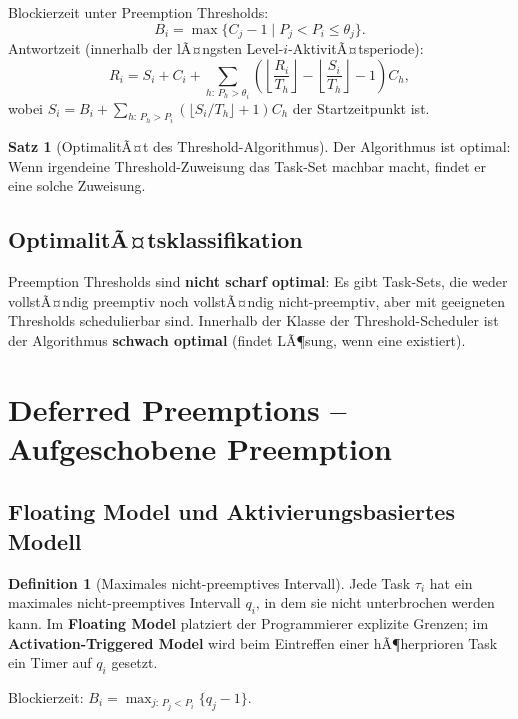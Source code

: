 ﻿\documentclass[a4paper,12pt]{report}
\theoremstyle{definition}
\newtheorem{definition}{Definition}[chapter]
\newtheorem{satz}{Satz}[chapter]
\begin{document}
Blockierzeit unter Preemption Thresholds:
\[
	B_i = \max\{C_j - 1 \mid P_j < P_i \leq \theta_j\}.
\]
Antwortzeit (innerhalb der lÃ¤ngsten Level-$i$-AktivitÃ¤tsperiode):
\begin{equation}
	R_i = S_i + C_i + \sum_{h:\,P_h > \theta_i}\left(\left\lfloor \frac{R_i}{T_h} \right\rfloor - \left\lfloor \frac{S_i}{T_h} \right\rfloor - 1\right) C_h,
	\label{eq:rta_threshold}
\end{equation}
wobei $S_i = B_i + \sum_{h:\,P_h > P_i}\left(\lfloor S_i/T_h \rfloor + 1\right) C_h$ der Startzeitpunkt ist.

\begin{satz}[OptimalitÃ¤t des Threshold-Algorithmus]
	Der Algorithmus ist optimal: Wenn irgendeine Threshold-Zuweisung das Task-Set
	machbar macht, findet er eine solche Zuweisung.
\end{satz}

\subsection{OptimalitÃ¤tsklassifikation}

Preemption Thresholds sind \textbf{nicht scharf optimal}: Es gibt Task-Sets, die
weder vollstÃ¤ndig preemptiv noch vollstÃ¤ndig nicht-preemptiv, aber mit geeigneten
Thresholds schedulierbar sind. Innerhalb der Klasse der Threshold-Scheduler ist der
Algorithmus \textbf{schwach optimal} (findet LÃ¶sung, wenn eine existiert).

\section{Deferred Preemptions -- Aufgeschobene Preemption}

\subsection{Floating Model und Aktivierungsbasiertes Modell}

\begin{definition}[Maximales nicht-preemptives Intervall]
	Jede Task $\tau_i$ hat ein maximales nicht-preemptives Intervall $q_i$, in dem
	sie nicht unterbrochen werden kann. Im \textbf{Floating Model} platziert der
	Programmierer explizite Grenzen; im \textbf{Activation-Triggered Model}
	wird beim Eintreffen einer hÃ¶herprioren Task ein Timer auf $q_i$ gesetzt.
\end{definition}

Blockierzeit: $B_i = \max_{j:\,P_j < P_i}\{q_j - 1\}$.
\end{document}
